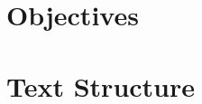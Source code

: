 \section{Objectives}
\label{sec:Objectives}





\section{Text Structure}
\label{sec:Text Structure}





